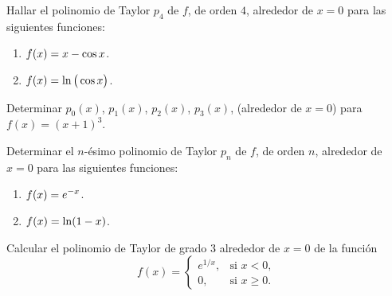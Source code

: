 \item Hallar el polinomio de Taylor $p_4$ de $f$, de orden $4$, alrededor de $x=0$ para las siguientes funciones:
\begin{multicols}{2}
  \begin{enumerate}
    \item $\displaystyle f(x)=x-\cos x$.
    \item $\displaystyle f(x)=\ln\big(\cos x\big)$.
  \end{enumerate}
\end{multicols}
\item Determinar $p_0(x)$, $p_1(x)$, $p_2(x)$, $p_3(x)$, (alrededor de $x=0$) para $f(x)=(x+1)^3$. 
\item Determinar el $n$-ésimo polinomio de Taylor $p_n$ de $f$, de orden $n$, alrededor de $x=0$ para las siguientes funciones:
\begin{multicols}{2}
  \begin{enumerate}
    \item $\displaystyle f(x)= e^{-x}$.
    \item $\displaystyle f(x)= \ln(1-x)$.
  \end{enumerate}
\end{multicols}

\item 
Calcular el polinomio de Taylor de grado 3 alrededor de $x=0$ de la función \[
  f(x)=\begin{cases}
      e^{1/x}, &\text{si } x<0,\\
      0, &\text{si }x\ge 0.
  \end{cases}
  \]